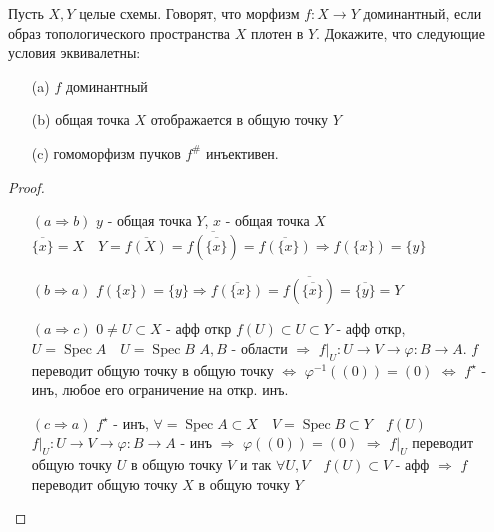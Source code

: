 \begin{prob}
Пусть $X, Y$ целые схемы. Говорят, что морфизм $f: X \rightarrow Y$ доминантный, если образ топологического пространства $X$ плотен в $Y$.
Докажите, что следующие условия эквивалетны:
\begin{itemize}
\item[]
\item[(a)] $f$ доминантный
\item[(b)] общая точка $X$ отображается в общую точку $Y$
\item[(c)] гомоморфизм пучков $f^{\#}$ инъективен.
\end{itemize}
\end{prob}
\begin{proof}
\begin{itemize}
\item[]
\item[$(a \Rightarrow b)$] $y$ - общая точка $Y$, $x$ - общая точка $X$\\
    $\overline{\{x\}} = X\quad Y = \overline{f(X)} = \overline{f(\overline{\{x\}})} = \overline{f(\{x\})} \Rightarrow f(\{x\}) = \{y\}$
\item[$(b \Rightarrow a)$] $f(\{x\}) = \{y\} \Rightarrow \overline{f(\{x\})} = \overline{f(\overline{\{x\}})} = \overline{\{y\}} = Y$
\item[$(a \Rightarrow c)$] $0 \ne U \subset X$ - афф откр $f(U) \subset U \subset Y$ - афф откр,
    $U = \operatorname{Spec} A\quad U = \operatorname{Spec} B$ $A, B$ - области $\Rightarrow$ $f|_{U}: U \to V \to \varphi: B \to A$. $f$ переводит общую точку в общую точку $\Leftrightarrow$ $\varphi^{-1}((0)) = (0)$ $\Leftrightarrow$ $f^{\star}$ - инъ, любое его ограничение на откр. инъ.
\item[$(c \Rightarrow a)$]
    $f^{\star}$ - инъ, $\forall  = \operatorname{Spec} A \subset X\quad V = \operatorname{Spec} B \subset Y\quad f(U)$ $f|_{U}: U \to V \to \varphi: B \to A$ - инъ $\Rightarrow$ $\varphi((0)) = (0)$ $\Rightarrow$ $f|_{U}$ переводит общую точку $U$ в общую точку $V$ и так $\forall U, V\quad f(U) \subset V$ - афф $\Rightarrow$ $f$ переводит общую точку $X$ в общую точку $Y$
\end{itemize}
\end{proof}
\begin{comment}

\end{comment}
\vskip 0.6in





